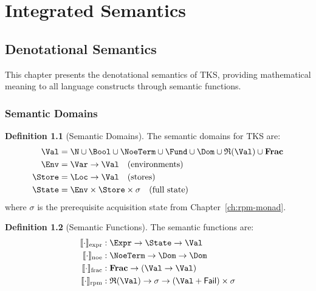 \documentclass[11pt,twoside,openright]{book}
\theoremstyle{definition}
\newtheorem{definition}{Definition}[chapter]
\theoremstyle{plain}
\theoremstyle{remark}
\newcommand{\RPM}{\mathfrak{R}}
\newcommand{\FracSet}{\mathbf{Frac}}
\newcommand{\AcqState}{\sigma}
\newcommand{\Failed}{\mathsf{Fail}}
\begin{document}

\part{Integrated Semantics}

\chapter{Denotational Semantics}
\label{ch:denotational}

This chapter presents the denotational semantics of TKS, providing mathematical meaning to all language constructs through semantic functions.

\section{Semantic Domains}

\begin{definition}[Semantic Domains]
\label{def:semantic-domains}
The semantic domains for TKS are:
\begin{align}
\Val &= \N \cup \Bool \cup \NoeTerm \cup \Fund \cup \Dom \cup \RPM(\Val) \cup \FracSet \\
\Env &= \Var \to \Val \quad \text{(environments)} \\
\Store &= \Loc \to \Val \quad \text{(stores)} \\
\State &= \Env \times \Store \times \AcqState \quad \text{(full state)}
\end{align}
where $\AcqState$ is the prerequisite acquisition state from Chapter~\ref{ch:rpm-monad}.
\end{definition}

\begin{definition}[Semantic Functions]
\label{def:semantic-functions}
The semantic functions are:
\begin{align}
\llbracket \cdot \rrbracket_{\text{expr}} &: \Expr \to \State \to \Val \\
\llbracket \cdot \rrbracket_{\text{noe}} &: \NoeTerm \to \Dom \to \Dom \\
\llbracket \cdot \rrbracket_{\text{frac}} &: \FracSet \to (\Val \to \Val) \\
\llbracket \cdot \rrbracket_{\text{rpm}} &: \RPM(\Val) \to \AcqState \to (\Val + \Failed) \times \AcqState
\end{align}
\end{definition}
\end{document}

